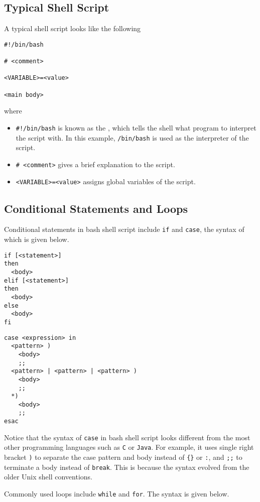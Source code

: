 \subsection{Typical Shell Script}

A typical shell script looks like the following
\begin{lstlisting}
#!/bin/bash

# <comment>

<VARIABLE>=<value>

<main body>
\end{lstlisting}
where
\begin{itemize}
  \item \verb|#!/bin/bash| is known as the , which tells the shell what program to interpret the script with. In this example, \verb|/bin/bash| is used as the interpreter of the script.
  \item \verb|# <comment>| gives a brief explanation to the script.
  \item \verb|<VARIABLE>=<value>| assigns global variables of the script.
\end{itemize}

\subsection{Conditional Statements and Loops}

Conditional statements in bash shell script include \verb|if| and \verb|case|, the syntax of which is given below.

\begin{lstlisting}
if [<statement>]
then
  <body>
elif [<statement>]
then
  <body>
else
  <body>
fi
\end{lstlisting} 

\begin{lstlisting}
case <expression> in
  <pattern> )
    <body>
    ;;
  <pattern> | <pattern> | <pattern> )
    <body>
    ;;
  *)
    <body>
    ;;
esac
\end{lstlisting}

Notice that the syntax of \verb|case| in bash shell script looks different from the most other programming languages such as \verb|C| or \verb|Java|. For example, it uses single right bracket \verb|)| to separate the case pattern and body instead of \verb|{}| or \verb|:|, and \verb|;;| to terminate a body instead of \verb|break|. This is because the syntax evolved from the older Unix shell conventions.

Commonly used loops include \verb|while| and \verb|for|. The syntax is given below.


